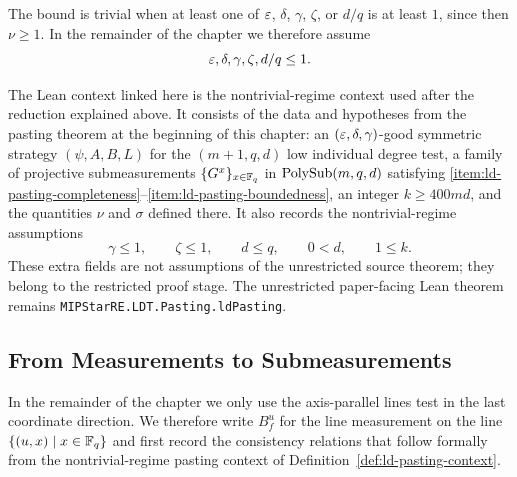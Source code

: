 The bound is trivial when at least one of $\varepsilon$, $\delta$, $\gamma$, $\zeta$, or $d/q$ is at least $1$, since then $\nu \ge 1$. In the remainder of the chapter we therefore assume
\[
	\varepsilon,\delta,\gamma,\zeta,d/q \le 1.
\]

\begin{definition}\label{def:ld-pasting-context}
	\leanok
	The Lean context linked here is the nontrivial-regime context used after the
	reduction explained above.  It consists of the data and hypotheses from the
	pasting theorem at the beginning of this chapter: an $(\varepsilon,\delta,\gamma)$-good symmetric strategy
	$(\psi,A,B,L)$ for the $(m+1,q,d)$ low individual degree test, a family of
	projective submeasurements $\{G^x\}_{x \in \mathbb{F}_q}$ in $\mathrm{PolySub}(m,q,d)$
	satisfying \ref{item:ld-pasting-completeness}--\ref{item:ld-pasting-boundedness},
	an integer $k \ge 400md$, and the quantities $\nu$ and $\sigma$ defined there.
	It also records the nontrivial-regime assumptions
	\[
		\gamma \le 1,\qquad \zeta \le 1,\qquad d \le q,\qquad 0<d,\qquad 1\le k.
	\]
	These extra fields are not assumptions of the unrestricted source theorem;
	they belong to the restricted proof stage.  The unrestricted paper-facing Lean
	theorem remains \texttt{MIPStarRE.LDT.Pasting.ldPasting}.
\end{definition}

\subsection{From Measurements to Submeasurements}

In the remainder of the chapter we only use the axis-parallel lines test in the
last coordinate direction. We therefore write $B_f^u$ for the line measurement
on the line $\{(u,x)\mid x\in\mathbb{F}_q\}$ and first record the consistency relations
that follow formally from the nontrivial-regime pasting context of
Definition~\ref{def:ld-pasting-context}.

